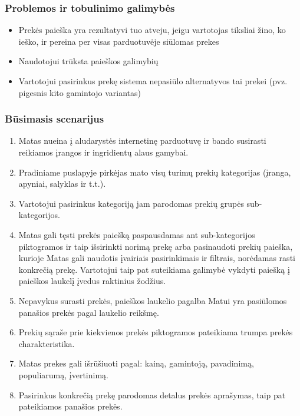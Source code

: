 \documentclass[oneside]{VUMIFPSkursinis}
\begin{document}
		\subsubsection{Problemos ir tobulinimo galimybės}
			\begin{itemize}
				\item{Prekės paieška yra rezultatyvi tuo atveju, jeigu vartotojas tiksliai žino, ko ieško, ir pereina per visas parduotuvėje siūlomas prekes}
				\item{Naudotojui trūksta paieškos galimybių}
				\item{Vartotojui pasirinkus prekę sistema nepasiūlo alternatyvos tai prekei (pvz. pigesnis kito gamintojo variantas)}
			\end{itemize}
		\subsubsection{Būsimasis scenarijus}
			\begin{enumerate}
				\item{Matas nueina į aludarystės internetinę parduotuvę ir bando susirasti reikiamos įrangos ir ingridientų alaus gamybai.}
				\item{Pradiniame puslapyje pirkėjas mato visų turimų prekių kategorijas (įranga, apyniai, salyklas ir t.t.).}
				\item{Vartotojui pasirinkus kategoriją jam parodomas prekių grupės sub-kategorijos.}
				\item{Matas gali tęsti prekės paiešką paspausdamas ant sub-kategorijos piktogramos ir taip išsirinkti norimą prekę arba pasinaudoti prekių paieška, kurioje Matas gali naudotis įvairiais  pasirinkimais ir filtrais, norėdamas rasti konkrečią prekę. Vartotojui taip pat suteikiama galimybė vykdyti paiešką į paieškos laukelį įvedus raktinius žodžius.}
				\item{Nepavykus surasti prekės, paieškos laukelio pagalba Matui yra pasiūlomos panašios prekės pagal laukelio reikšmę.}
				\item{Prekių sąraše prie kiekvienos prekės piktogramos pateikiama trumpa prekės charakteristika. }
				\item{Matas prekes gali išrūšiuoti pagal: kainą, gamintoją, pavadinimą, populiarumą, įvertinimą.}
				\item{Pasirinkus konkrečią prekę parodomas detalus prekės aprašymas, taip pat pateikiamos panašios prekės.}
			\end{enumerate}
	\iffalse
\end{document}
